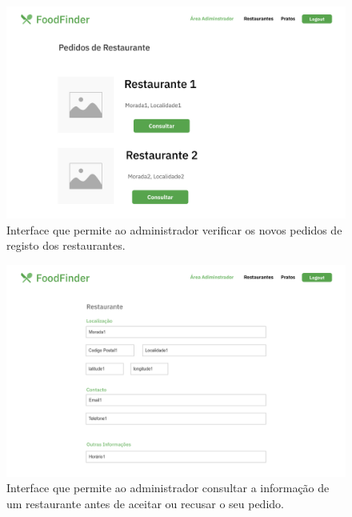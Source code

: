 \documentclass[a4paper,12pt]{report}
\begin{document}
	\begin{figure}[H]
	\begin{center}
	\includegraphics[scale=0.25]{14.1-Pedidos_Restaurante_Administrador}	
	\end{center}
	\caption{Interface que permite ao administrador verificar os novos pedidos de registo dos restaurantes.}
	\end{figure} 
	
	\begin{figure}[H]
	\begin{center}
	\includegraphics[scale=0.25]{15.1-Pedidos_Restaurante_Consultar_Administrador_1}	
	\end{center}
	\caption{Interface que permite ao administrador consultar a informação de um restaurante antes de aceitar ou recusar o seu pedido.}
	\end{figure} 
	
\end{document}
